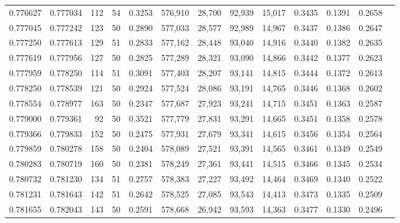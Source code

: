 \begin{tabular}{rrrrrrrrrrrrr}
0.776627 & 0.777034 &   112 &  54 &                                     0.3253 & 576,910 &  28,700 &  92,939 &  15,017 & 0.3435 & 0.1391 & 0.2658 \\
0.777045 & 0.777242 &   123 &  50 &                                     0.2890 & 577,033 &  28,577 &  92,989 &  14,967 & 0.3437 & 0.1386 & 0.2647 \\
0.777250 & 0.777613 &   129 &  51 &                                     0.2833 & 577,162 &  28,448 &  93,040 &  14,916 & 0.3440 & 0.1382 & 0.2635 \\
0.777619 & 0.777956 &   127 &  50 &                                     0.2825 & 577,289 &  28,321 &  93,090 &  14,866 & 0.3442 & 0.1377 & 0.2623 \\
0.777959 & 0.778250 &   114 &  51 &                                     0.3091 & 577,403 &  28,207 &  93,141 &  14,815 & 0.3444 & 0.1372 & 0.2613 \\
0.778250 & 0.778539 &   121 &  50 &                                     0.2924 & 577,524 &  28,086 &  93,191 &  14,765 & 0.3446 & 0.1368 & 0.2602 \\
0.778554 & 0.778977 &   163 &  50 &                                     0.2347 & 577,687 &  27,923 &  93,241 &  14,715 & 0.3451 & 0.1363 & 0.2587 \\
0.779000 & 0.779361 &    92 &  50 &                                     0.3521 & 577,779 &  27,831 &  93,291 &  14,665 & 0.3451 & 0.1358 & 0.2578 \\
0.779366 & 0.779833 &   152 &  50 &                                     0.2475 & 577,931 &  27,679 &  93,341 &  14,615 & 0.3456 & 0.1354 & 0.2564 \\
0.779859 & 0.780278 &   158 &  50 &                                     0.2404 & 578,089 &  27,521 &  93,391 &  14,565 & 0.3461 & 0.1349 & 0.2549 \\
0.780283 & 0.780719 &   160 &  50 &                                     0.2381 & 578,249 &  27,361 &  93,441 &  14,515 & 0.3466 & 0.1345 & 0.2534 \\
0.780732 & 0.781230 &   134 &  51 &                                     0.2757 & 578,383 &  27,227 &  93,492 &  14,464 & 0.3469 & 0.1340 & 0.2522 \\
0.781231 & 0.781643 &   142 &  51 &                                     0.2642 & 578,525 &  27,085 &  93,543 &  14,413 & 0.3473 & 0.1335 & 0.2509 \\
0.781655 & 0.782043 &   143 &  50 &                                     0.2591 & 578,668 &  26,942 &  93,593 &  14,363 & 0.3477 & 0.1330 & 0.2496 \\

\end{tabular}
